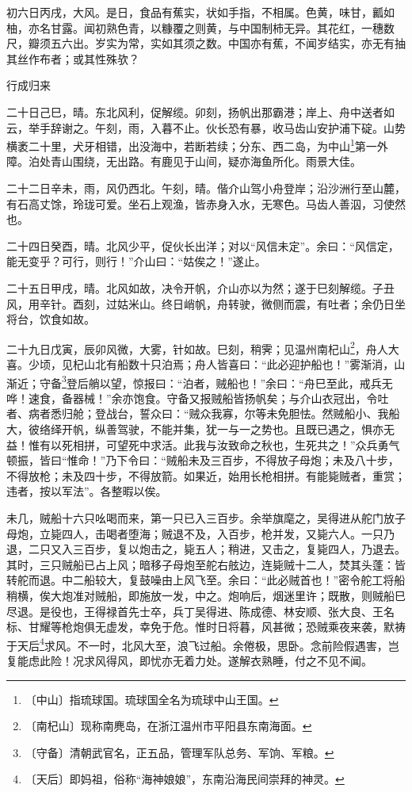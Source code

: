 \documentclass[12pt,UTF-8,openany]{ctexbook}
\begin{document}
\begin{normalsize}
    初六日丙戌，大风。是日，食品有蕉实，状如手指，不相属。色黄，味甘，瓤如柚，亦名甘露。闻初熟色青，以糠覆之则黄，与中国制柿无异。其花红，一穗数尺，瓣须五六出。岁实为常，实如其须之数。中国亦有蕉，不闻岁结实，亦无有抽其丝作布者；或其性殊欤？
    
    行成归来
    
    二十日己巳，晴。东北风利，促解缆。卯刻，扬帆出那霸港；岸上、舟中送者如云，举手辞谢之。午刻，雨，入暮不止。伙长恐有暴，收马齿山安护浦下碇。山势横袤二十里，犬牙相错，出没海中，若断若续；分东、西二岛，为中山\footnote{〔中山〕指琉球国。琉球国全名为琉球中山王国。}第一外障。泊处青山围绕，无出路。有鹿见于山间，疑亦海鱼所化。雨景大佳。
    
    二十二日辛未，雨，风仍西北。午刻，晴。偕介山驾小舟登岸；沿沙洲行至山麓，有石高丈馀，玲珑可爱。坐石上观渔，皆赤身入水，无寒色。马齿人善泅，习使然也。
    
    二十四日癸酉，晴。北风少平，促伙长出洋；对以“风信未定”。余曰：“风信定，能无变乎？可行，则行！”介山曰：“姑俟之！”遂止。
    
    二十五日甲戌，晴。北风如故，决令开帆，介山亦以为然；遂于巳刻解缆。子丑风，用辛针。酉刻，过姑米山。终日峭帆，舟转驶，微侧而震，有吐者；余仍日坐将台，饮食如故。
    
    二十九日戊寅，辰卯风微，大雾，针如故。巳刻，稍霁；见温州南杞山\footnote{〔南杞山〕现称南麂岛，在浙江温州市平阳县东南海面。}，舟人大喜。少顷，见杞山北有船数十只泊焉；舟人皆喜曰：“此必迎护船也！”雾渐消，山渐近；守备\footnote{〔守备〕清朝武官名，正五品，管理军队总务、军饷、军粮。}登后艄以望，惊报曰：“泊者，贼船也！”余曰：“舟巳至此，戒兵无哗！速食，备器械！”余亦饱食。守备又报贼船皆扬帆矣；与介山衣冠出，令吐者、病者悉归舱；登战台，誓众曰：“贼众我寡，尔等未免胆怯。然贼船小、我船大，彼络绎开帆，纵善驾驶，不能并集，犹一与一之势也。且既已遇之，惧亦无益！惟有以死相拼，可望死中求活。此我与汝致命之秋也，生死共之！”众兵勇气顿振，皆曰“惟命！”乃下令曰：“贼船未及三百步，不得放子母炮；未及八十步，不得放枪；未及四十步，不得放箭。如果近，始用长枪相拼。有能毙贼者，重赏；违者，按以军法”。各整暇以俟。
    
    未几，贼船十六只吆喝而来，第一只已入三百步。余举旗麾之，吴得进从舵门放子母炮，立毙四人，击喝者堕海；贼退不及，入百步，枪并发，又毙六人。一只乃退，二只又入三百步，复以炮击之，毙五人；稍进，又击之，复毙四人，乃退去。其时，三只贼船已占上风；暗移子母炮至舵右舷边，连毙贼十二人，焚其头蓬：皆转舵而退。中二船较大，复鼓噪由上风飞至。余曰：“此必贼首也！”密令舵工将船稍横，俟大炮准对贼船，即施放一发，中之。炮响后，烟迷里许；既散，则贼船巳尽退。是役也，王得禄首先士卒，兵丁吴得进、陈成德、林安顺、张大良、王名标、甘耀等枪炮俱无虚发，幸免于危。惟时日将暮，风甚微；恐贼乘夜来袭，默祷于天后\footnote{〔天后〕即妈祖，俗称“海神娘娘”，东南沿海民间崇拜的神灵。}求风。不一时，北风大至，浪飞过船。余倦极，思卧。念前险假遇害，岂复能虑此险！况求风得风，即忧亦无着力处。遂解衣熟睡，付之不见不闻。
    

\end{normalsize}
\end{document}
